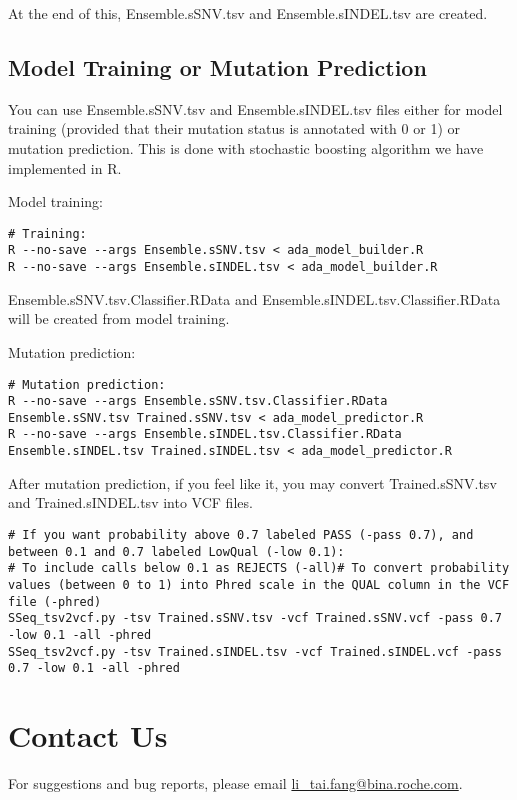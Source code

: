 \documentclass[10pt,letterpaper]{article}
\begin{document}
\begin{sloppypar}
At the end of this, Ensemble.sSNV.tsv and Ensemble.sINDEL.tsv are created. 



\subsection{Model Training or Mutation Prediction}

You can use Ensemble.sSNV.tsv and Ensemble.sINDEL.tsv files either for model training (provided that their mutation status is annotated with 0 or 1) or mutation prediction. This is done with stochastic boosting algorithm we have implemented in R. 
	
Model training:
\begin{lstlisting}
# Training:
R --no-save --args Ensemble.sSNV.tsv < ada_model_builder.R
R --no-save --args Ensemble.sINDEL.tsv < ada_model_builder.R
\end{lstlisting}
	
Ensemble.sSNV.tsv.Classifier.RData and Ensemble.sINDEL.tsv.Classifier.RData will be created from model training.
	

Mutation prediction:
	
\begin{lstlisting}
# Mutation prediction:
R --no-save --args Ensemble.sSNV.tsv.Classifier.RData Ensemble.sSNV.tsv Trained.sSNV.tsv < ada_model_predictor.R
R --no-save --args Ensemble.sINDEL.tsv.Classifier.RData Ensemble.sINDEL.tsv Trained.sINDEL.tsv < ada_model_predictor.R
\end{lstlisting}

	
After mutation prediction, if you feel like it, you may convert Trained.sSNV.tsv and Trained.sINDEL.tsv into VCF files. 

\begin{lstlisting}
# If you want probability above 0.7 labeled PASS (-pass 0.7), and between 0.1 and 0.7 labeled LowQual (-low 0.1):
# To include calls below 0.1 as REJECTS (-all)# To convert probability values (between 0 to 1) into Phred scale in the QUAL column in the VCF file (-phred)
SSeq_tsv2vcf.py -tsv Trained.sSNV.tsv -vcf Trained.sSNV.vcf -pass 0.7 -low 0.1 -all -phred
SSeq_tsv2vcf.py -tsv Trained.sINDEL.tsv -vcf Trained.sINDEL.vcf -pass 0.7 -low 0.1 -all -phred
\end{lstlisting}




\section{Contact Us}
For suggestions and bug reports, please email \href{mailto:li_tai.fang@bina.roche.com}{li\_tai.fang@bina.roche.com}.


\end{sloppypar}
\end{document}
